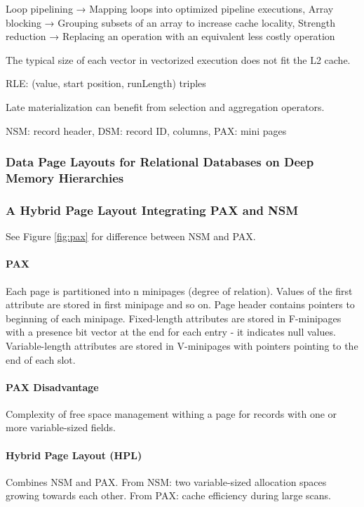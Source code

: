 Loop pipelining → Mapping loops into optimized pipeline executions, Array blocking → Grouping subsets of an array to increase cache locality, Strength reduction → Replacing an operation with an equivalent less costly operation

The typical size of each vector in vectorized execution does not fit the L2 cache.

RLE: (value, start position, runLength) triples

Late materialization can benefit from selection and aggregation operators.


NSM: record header, DSM: record ID, columns, PAX: mini pages






\subsubsection{Data Page Layouts for Relational Databases on Deep Memory Hierarchies}





\subsubsection{A Hybrid Page Layout Integrating PAX and NSM}

See Figure \ref{fig:pax} for difference between NSM and PAX.

\paragraph{PAX}
Each page is partitioned into n minipages (degree of relation). Values of the first attribute are stored in first minipage and so on. Page header contains pointers to beginning of each minipage. Fixed-length attributes are stored in F-minipages with a presence bit vector at the end for each entry - it indicates null values. Variable-length attributes are stored in V-minipages with pointers pointing to the end of each slot.

\paragraph{PAX Disadvantage}
Complexity of free space management withing a page for records with one or more variable-sized fields.

\paragraph{Hybrid Page Layout (HPL)}
Combines NSM and PAX. From NSM: two variable-sized allocation spaces growing towards each other. From PAX: cache efficiency during large scans.


